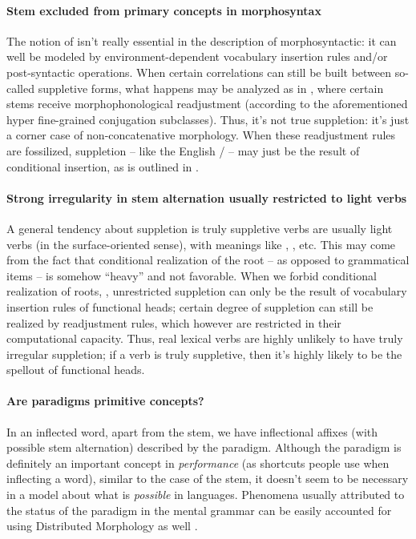 {\paragraph{Stem excluded from primary concepts in morphosyntax} 
The notion of  isn't really essential in the description of morphosyntactic:
it can well be modeled by environment-dependent vocabulary insertion rules 
and/or post-syntactic operations.
When certain correlations can still be built between so-called suppletive forms,
what happens may be analyzed as in \citet{embick2005status},
where certain stems receive morphophonological readjustment
(according to the aforementioned hyper fine-grained conjugation subclasses).
Thus, it's not true suppletion:
it's just a corner case of non-concatenative morphology.
When these readjustment rules are fossilized,
suppletion -- like the English / -- 
may just be the result of conditional insertion,
as is outlined in \citet{siddiqi2009syntax}.

\paragraph{Strong irregularity in stem alternation usually restricted to light verbs} 
A general tendency about suppletion
is truly suppletive verbs are usually light verbs 
(in the surface-oriented sense),
with meanings like , , etc.
This may come from the fact that conditional realization of the root -- 
as opposed to grammatical items --
is somehow ``heavy'' and not favorable.
When we forbid conditional realization of roots,
\citep{embick2005status},
unrestricted suppletion can only be the result of 
vocabulary insertion rules of functional heads;
certain degree of suppletion can still be realized by readjustment rules,
which however are restricted in their computational capacity.
Thus, real lexical verbs are highly unlikely to have truly irregular suppletion;
if a verb is truly suppletive,
then it's highly likely to be 
the spellout of \vP{} functional heads.

\paragraph{Are paradigms primitive concepts?} 
In an inflected word, apart from the stem, 
we have inflectional affixes (with possible stem alternation) described by the paradigm.
Although the paradigm is definitely an important concept 
in \emph{performance} (as shortcuts people use when inflecting a word),
similar to the case of the stem,
it doesn't seem to be necessary 
in a model about what is \emph{possible} in languages.
Phenomena usually attributed to the status of the paradigm in 
the mental grammar 
can be easily accounted for using Distributed Morphology as well 
\citep{embick2000features,bobaljik2002syncretism}.

}
